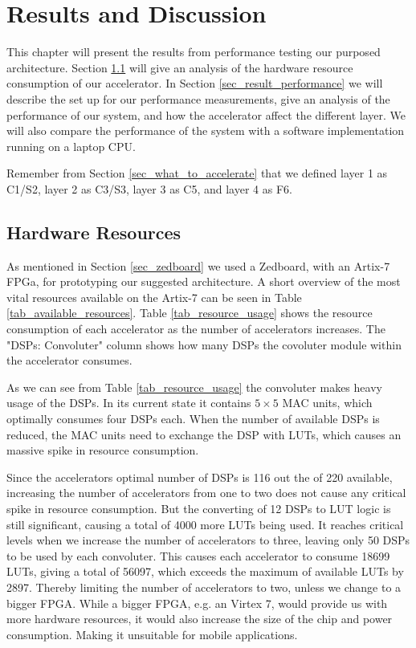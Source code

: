 \chapter{Results and Discussion} \label{chap_results}

This chapter will present the results from performance testing our purposed architecture. Section \ref{sec_hardware_resources} will give an analysis of the hardware resource consumption of our accelerator. In Section \ref{sec_result_performance} we will describe the set up for our performance measurements, give an analysis of the performance of our system, and how the accelerator affect the different layer. We will also compare the performance of the system with a software implementation running on a laptop CPU. 

Remember from Section \ref{sec_what_to_accelerate} that we defined layer 1 as C1/S2, layer 2 as C3/S3, layer 3 as C5, and layer 4 as F6.


\section{Hardware Resources} \label{sec_hardware_resources}

As mentioned in Section \ref{sec_zedboard} we used a Zedboard, with an Artix-7 FPGa, for prototyping our suggested architecture. A short overview of the most vital resources available on the Artix-7 can be seen in Table \ref{tab_available_resources}. Table \ref{tab_resource_usage} shows the resource consumption of each accelerator as the number of accelerators increases. The "DSPs: Convoluter" column shows how many DSPs the covoluter module within the accelerator consumes.

As we can see from Table \ref{tab_resource_usage} the convoluter makes heavy usage of the DSPs. In its current state it contains $ 5 \times 5 $ MAC units, which optimally consumes four DSPs each. When the number of available DSPs is reduced, the MAC units need to exchange the DSP with LUTs, which causes an massive spike in resource consumption.

Since the accelerators optimal number of DSPs is 116 out the of 220 available, increasing the number of accelerators from one to two does not cause any critical spike in resource consumption. But the converting of 12 DSPs to LUT logic is still significant, causing a total of 4000 more LUTs being used. It reaches critical levels when we increase the number of accelerators to three, leaving only 50 DSPs to be used by each convoluter. This causes each accelerator to consume 18699 LUTs, giving a total of 56097, which exceeds the maximum of available LUTs by 2897. Thereby limiting the number of accelerators to two, unless we change to a bigger FPGA. While a bigger FPGA, e.g. an Virtex 7, would provide us with more hardware resources, it would also increase the size of the chip and power consumption. Making it unsuitable for mobile applications.

